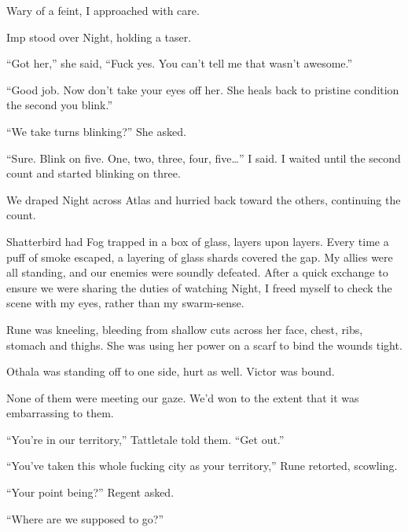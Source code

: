 Wary of a feint, I approached with care.



Imp stood over Night, holding a taser.



``Got her,'' she said, ``Fuck yes.  You can't tell me that wasn't awesome.''



``Good job.  Now don't take your eyes off her.  She heals back to pristine condition the second you blink.''



``We take turns blinking?''  She asked.



``Sure.  Blink on five.  One, two, three, four, five\ldots'' I said.  I waited until the second count and started blinking on three.



We draped Night across Atlas and hurried back toward the others, continuing the count.



Shatterbird had Fog trapped in a box of glass, layers upon layers.  Every time a puff of smoke escaped, a layering of glass shards covered the gap.  My allies were all standing, and our enemies were soundly defeated.  After a quick exchange to ensure we were sharing the duties of watching Night, I freed myself to check the scene with my eyes, rather than my swarm-sense.



Rune was kneeling, bleeding from shallow cuts across her face, chest, ribs, stomach and thighs.  She was using her power on a scarf to bind the wounds tight.



Othala was standing off to one side, hurt as well.  Victor was bound.



None of them were meeting our gaze.  We'd won to the extent that it was embarrassing to them.



``You're in our territory,'' Tattletale told them.  ``Get out.''



``You've taken this whole fucking city as your territory,'' Rune retorted, scowling.



``Your point being?'' Regent asked.



``Where are we supposed to go?''



